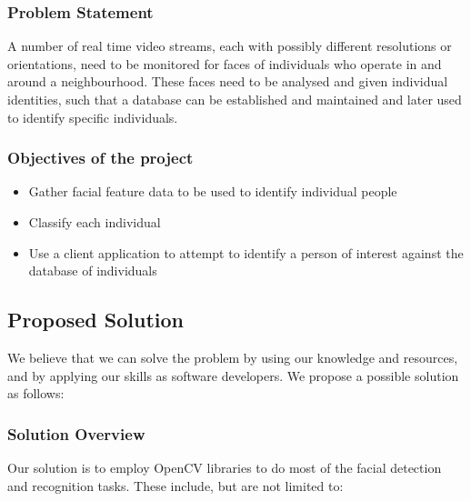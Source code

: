 \documentclass[a4paper]{article}
\begin{document}
			\subsubsection{Problem Statement}
			
			A number of real time video streams, each with possibly different resolutions or orientations, need to be monitored for
			faces of individuals who operate in and around a neighbourhood. These faces need to be analysed and given individual identities,
			such that a database can be established and maintained and later used to identify specific individuals.
			
			\subsubsection{Objectives of the project}
			
				\begin{itemize}
				
					\item Gather facial feature data to be used to identify individual people
					
					\item Classify each individual
					
					\item Use a client application to attempt to identify a person of interest against the database of individuals
			
				\end{itemize}
			
		\subsection{Proposed Solution}
		
		We believe that we can solve the problem by using our knowledge and resources, and by applying our skills as software developers.
		We propose a possible solution as follows:
		
			\subsubsection{Solution Overview}
			
			Our solution is to employ OpenCV libraries to do most of the facial detection and recognition tasks. These include, but are not limited to:
				
\end{document}
